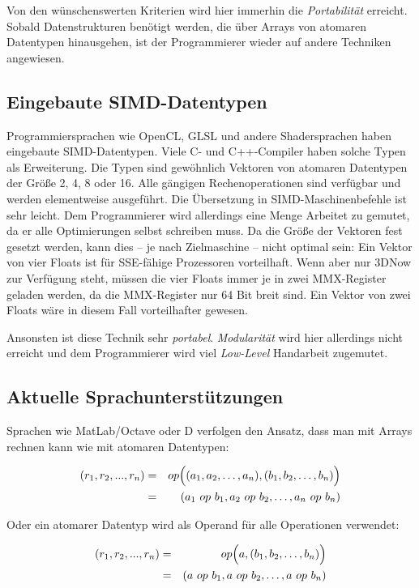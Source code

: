 \documentclass[a4paper,10pt]{article}
\begin{document}
Von den wünschenswerten Kriterien wird hier immerhin die \emph{Portabilität} erreicht. Sobald
Datenstrukturen benötigt werden, die über Arrays von atomaren Datentypen hinausgehen, ist der
Programmierer wieder auf andere Techniken angewiesen.

\subsection{Eingebaute SIMD-Datentypen}

Programmiersprachen wie OpenCL, GLSL und andere Shadersprachen haben eingebaute SIMD-Datentypen.
Viele C- und C++-Compiler haben solche Typen als Erweiterung. Die Typen sind gewöhnlich Vektoren von
atomaren Datentypen der Größe 2, 4, 8 oder 16. Alle gängigen Rechenoperationen sind verfügbar und
werden elementweise ausgeführt. Die Übersetzung in SIMD-Maschinenbefehle ist sehr leicht.  Dem
Programmierer wird allerdings eine Menge Arbeitet zu gemutet, da er alle Optimierungen selbst
schreiben muss. Da die Größe der Vektoren fest gesetzt werden, kann dies -- je nach Zielmaschine --
nicht optimal sein: Ein Vektor von vier Floats ist für SSE-fähige Prozessoren vorteilhaft. Wenn aber
nur 3DNow zur Verfügung steht, müssen die vier Floats immer je in zwei MMX-Register geladen werden,
da die MMX-Register nur 64 Bit breit sind. Ein Vektor von zwei Floats wäre in diesem Fall
vorteilhafter gewesen.

Ansonsten ist diese Technik sehr \emph{portabel}. \emph{Modularität} wird hier allerdings nicht
erreicht und dem Programmierer wird viel \emph{Low-Level} Handarbeit zugemutet.


\subsection{Aktuelle Sprachunterstützungen}

Sprachen wie MatLab/Octave oder D verfolgen den Ansatz, dass man mit Arrays rechnen kann wie mit
atomaren Datentypen:

\begin{eqnarray*}
    (r_1, r_2, ..., r_n)    & = & op\Bigl( (a_1, a_2, \dots, a_n), (b_1, b_2, \dots, b_n) \Bigr)\\ 
                            & = & (a_1 \ op \ b_1, a_2 \ op \ b_2, \dots, a_n \ op \ b_n)
\end{eqnarray*}

Oder ein atomarer Datentyp wird als Operand für alle Operationen verwendet:

\begin{eqnarray*}
    (r_1, r_2, ..., r_n)    & = & op\Bigl( a, (b_1, b_2, \dots, b_n) \Bigr)\\ 
                            & = & (a \ op \ b_1, a \ op \ b_2, \dots, a \ op \ b_n)
\end{eqnarray*}
\end{document}
